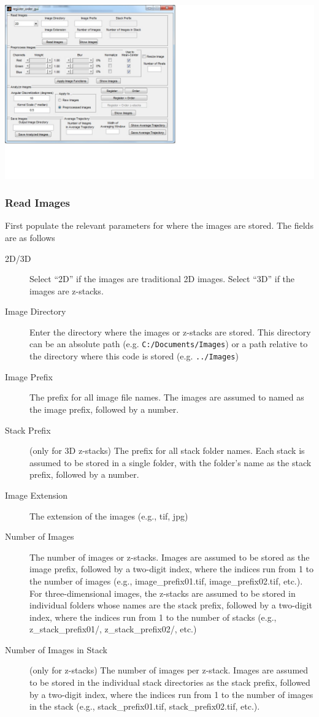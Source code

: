 \documentclass[12pt]{article}
\begin{document}
\includegraphics[width=\textwidth, trim=0cm 3cm 12cm 0cm, clip]{gui_screenshot_initial.jpg}


\subsubsection{Read Images}

First populate the relevant parameters for where the images are stored.
%
The fields are as follows
\begin{description}
%
\item[2D/3D] Select ``2D'' if the images are traditional 2D images. Select ``3D'' if the images are z-stacks.
%
\item[Image Directory] Enter the directory where the images or z-stacks are stored. This directory can be an absolute path (e.g. \texttt{C:/Documents/Images}) or a path relative to the directory where this code is stored (e.g. \texttt{../Images})
%
\item[Image Prefix] The prefix for all image file names. The images are assumed to named as the image prefix, followed by a number. 
%
\item[Stack Prefix] (only for 3D z-stacks) The prefix for all stack folder names. Each stack is assumed to be stored in a single folder, with the folder's name as the stack prefix, followed by a number. 
%
\item[Image Extension] The extension of the images (e.g., tif, jpg)
%
\item[Number of Images] The number of images or z-stacks. Images are assumed to be stored as the image prefix, followed by a two-digit index, where the indices run from 1 to the number of images (e.g., image\_prefix01.tif, image\_prefix02.tif, etc.). For three-dimensional images, the z-stacks are assumed to be stored in individual folders whose names are the stack prefix, followed by a two-digit index, where the indices run from 1 to the number of stacks (e.g., z\_stack\_prefix01/, z\_stack\_prefix02/, etc.)
%
\item[Number of Images in Stack] (only for z-stacks) The number of images per z-stack. Images are assumed to be stored in the individual stack directories as the stack prefix, followed by a two-digit index, where the indices run from 1 to the number of images in the stack (e.g., stack\_prefix01.tif, stack\_prefix02.tif, etc.). 
%
\end{description}
\end{document}
